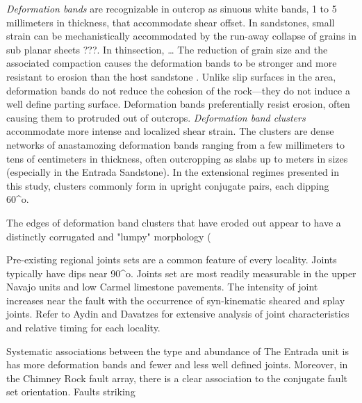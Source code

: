 \documentclass[12pt,a4paper]{article}
\begin{document}
{\textit{Deformation bands} are recognizable in outcrop as sinuous white bands, 1 to 5 millimeters in thickness, that accommodate shear offset. In sandstones, small strain can be mechanistically accommodated by the run-away collapse of grains in sub planar sheets \cite{shipton} ???. In thinsection, …  The reduction of grain size and the associated compaction causes the deformation bands to be stronger and more resistant to erosion than the host sandstone \cite{fossen}. Unlike slip surfaces in the area, deformation bands do not reduce the cohesion of the rock—they do not induce a well define parting surface. Deformation bands preferentially resist erosion, often causing them to protruded out of outcrops. \textit{Deformation band clusters} accommodate more intense and localized shear strain. The clusters are dense networks of anastamozing deformation bands ranging from a few millimeters to tens of centimeters in thickness, often outcropping as slabs up to meters in sizes (especially in the Entrada Sandstone). In the extensional regimes presented in this study, clusters commonly form in upright conjugate pairs, each dipping ~ 60^o.   

The edges of deformation band clusters that have eroded out appear to have a distinctly corrugated and "lumpy" morphology (%

Pre-existing regional joints sets are a common feature of every locality.  Joints typically have dips near 90^o. Joints set are most readily measurable in the upper Navajo units and low Carmel limestone pavements. The intensity of joint increases near the fault with the occurrence of syn-kinematic sheared and splay joints. Refer to Aydin and Davatzes for extensive analysis of joint characteristics and relative timing for each locality.

Systematic associations between the type and abundance of The Entrada unit is has more deformation bands and fewer and less well defined joints. Moreover, in the Chimney Rock fault array, there is a clear association to the conjugate fault set orientation. Faults striking 

}
\end{document}
